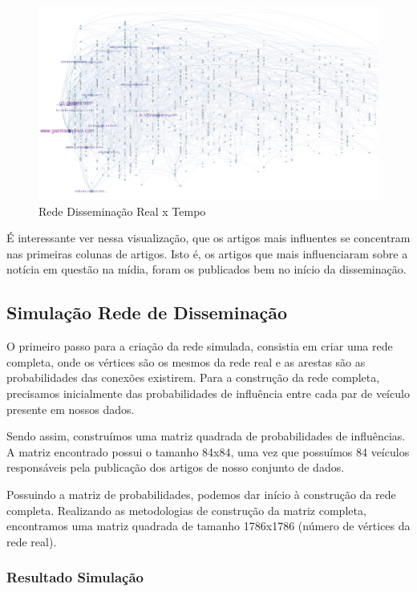 \documentclass[a4paper,12pt]{article}
\begin{document}
\pagebreak
\begin{figure}[ht]
 \includegraphics[scale=0.5]{../results/t.png}
 \caption{Rede Disseminação Real x Tempo}
\end{figure}

É interessante ver nessa visualização, que os artigos mais influentes se concentram nas primeiras colunas de artigos. Isto é, os artigos que mais
influenciaram sobre a notícia em questão na mídia, foram os publicados bem no início da disseminação.


\subsection{Simulação Rede de Disseminação}

O primeiro passo para a criação da rede simulada, consistia em criar uma rede completa, onde os vértices são os mesmos
da rede real e as arestas são as probabilidades das conexões existirem. Para a construção da rede completa, precisamos
inicialmente das probabilidades de influência entre cada par de veículo presente em nossos dados.

Sendo assim, construímos uma matriz quadrada de probabilidades de influências. A matriz encontrado possui o tamanho 84x84, uma vez que
possuímos 84 veículos responsáveis pela publicação dos artigos de nosso conjunto de dados.

Possuindo a matriz de probabilidades, podemos dar início à construção da rede completa. Realizando as metodologias de construção da matriz
completa, encontramos uma matriz quadrada de tamanho 1786x1786 (número de vértices da rede real). 


\pagebreak
\subsubsection{Resultado Simulação}
\end{document}
